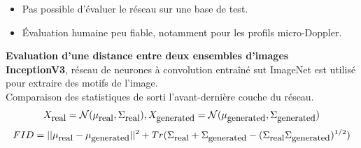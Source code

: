 \documentclass[a0,portrait]{a0poster}
\newcommand{\equtext}[1]{\mbox{\small{#1}}}
\begin{document}
\begin{multicols}{2}
\begin{tcolorbox}[colback=blue!5!lime,colframe=green!75!black,title={\section*{Mesurer les performances d'un GAN?}}]
\begin{itemize}
    \item Pas possible d'évaluer le réseau sur une base de test.
    \item Évaluation humaine peu fiable, notamment pour les profils micro-Doppler.
\end{itemize}
\end{tcolorbox}
\bigskip


\begin{tcolorbox}[colback=blue!5!white,colframe=blue!75!black,title={\section*{FID (Fréchet Inception Distance)}}]
\textbf{Evaluation d'une distance entre deux ensembles d'images}\\
\textbf{InceptionV3}, réseau de neurones à convolution entraîné sut ImageNet est utilisé pour extraire des motifs de l'image.\\
Comparaison des statistiques de sorti l'avant-dernière couche du réseau.%
\[X_{\equtext{real}}=\mathcal{N}(\mu_{\equtext{real}}, \Sigma_{\equtext{real}}), X_{\equtext{generated}}=\mathcal{N}(\mu_{\equtext{generated}}, \Sigma_{\equtext{generated}})\]
\[FID = ||\mu_{\equtext{real}} - \mu_{\equtext{generated}}||^2 + Tr(\Sigma_{\equtext{real}} + \Sigma_{\equtext{generated}}  - (\Sigma_{\equtext{real}} \Sigma_{\equtext{generated}})^{1/2})\]
\end{tcolorbox}
\bigskip



\end{multicols}
\end{document}
